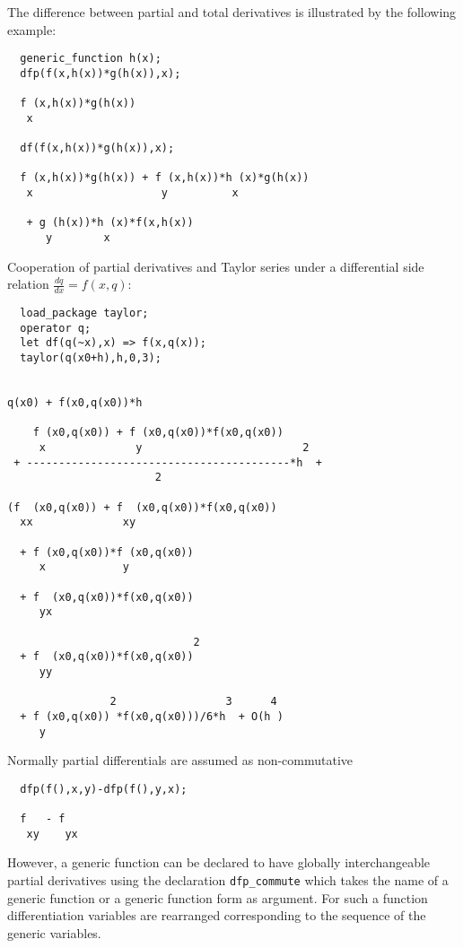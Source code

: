 The difference between partial and total derivatives is
illustrated by the following example:

\begin{verbatim}
  generic_function h(x);
  dfp(f(x,h(x))*g(h(x)),x);

  f (x,h(x))*g(h(x))
   x

  df(f(x,h(x))*g(h(x)),x);

  f (x,h(x))*g(h(x)) + f (x,h(x))*h (x)*g(h(x))
   x                    y          x

   + g (h(x))*h (x)*f(x,h(x))
      y        x
\end{verbatim}

Cooperation of partial derivatives and Taylor series under
a differential side relation $\frac{dq}{dx}=f(x,q)$:

\begin{verbatim}
  load_package taylor;
  operator q; 
  let df(q(~x),x) => f(x,q(x));
  taylor(q(x0+h),h,0,3);


q(x0) + f(x0,q(x0))*h

    f (x0,q(x0)) + f (x0,q(x0))*f(x0,q(x0))
     x              y                         2
 + -----------------------------------------*h  + 
                       2

(f  (x0,q(x0)) + f  (x0,q(x0))*f(x0,q(x0))
  xx              xy

  + f (x0,q(x0))*f (x0,q(x0))
     x            y

  + f  (x0,q(x0))*f(x0,q(x0))
     yx

                             2
  + f  (x0,q(x0))*f(x0,q(x0))
     yy

                2                 3      4
  + f (x0,q(x0)) *f(x0,q(x0)))/6*h  + O(h )
     y
\end{verbatim}

Normally partial differentials are assumed as non-commutative

\begin{verbatim}
  dfp(f(),x,y)-dfp(f(),y,x);

  f   - f
   xy    yx
\end{verbatim}

\hypertarget{command:DFP_COMMUTE}{}
However, a generic function can be declared to have globally
interchangeable partial derivatives using the declaration 
\texttt{dfp\_commute}
which takes the name of a generic function or a generic function
form as argument. For such a function differentiation variables are
rearranged corresponding to the sequence of the generic variables.

